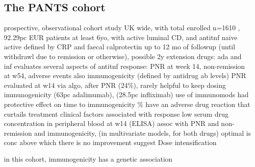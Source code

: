 \begin{outline}
\subsection{The PANTS cohort}

\1 prospective, observational cohort study UK wide, with total enrolled n=1610 , 92.29pc EUR \autocite{kennedy2019PredictorsAntiTNFTreatment}
    \2 patients at least 6yo, with active luminal CD, and antitnf naive
        \3 active defined by CRP and faecal calprotectin
    \2 up to 12 mo of followup (until withdrawl due to remission or otherwise), possible 2y extension
     drugs: ada and inf
    \2 evaluates several aspects of antitnf response: PNR at week 14, non-remission at w54, adverse events
        \3 also immunogenicity (defined by antidrug ab levels)
    \2 PNR evaluated at w14 via algo, after PNR (24\%), rarely helpful to keep dosing
    \2 immunogenicity (63pc adalimumab), (28.5pc infliximab)
        \3 use of immunomods had protective effect on time to immunogenicity 
    \% have an adverse drug reaction that curtails treatment
    \2 clinical factors associated with response
        \3 low serum drug concentration in peripheral blood at w14 (ELISA) assoc with PNR and non-remission and immunogenicity, (in multivariate models, for both drugs) 
        \3 optimal is conc above which there is no improvement
    \2 suggest Dose intensification

\1 in this cohort, immunogenicity has a genetic association \autocite{sazonovs2019HLADQA105Carriage} 


\end{outline}

